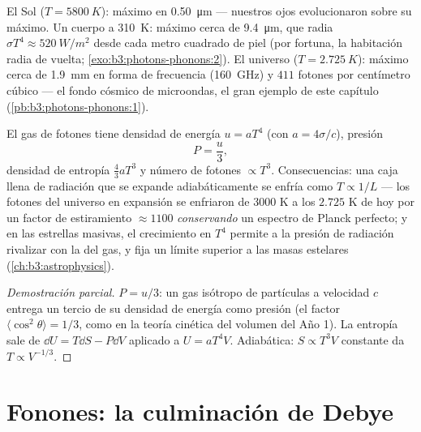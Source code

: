 \begin{example}\label{ex:b3:photons-phonons:thermometers}
El Sol ($T = \qty{5800}{K}$): máximo en \qty{0.50}{\micro m} ---
nuestros ojos evolucionaron sobre su máximo. Un cuerpo a \qty{310}{K}: máximo
cerca de \qty{9.4}{\micro m}, que radia $\sigma T^4 \approx
\qty{520}{W/m^2}$ desde cada metro cuadrado de piel (por fortuna, la
habitación radia de vuelta;
\cref{exo:b3:photons-phonons:2}). El universo ($T =
\qty{2.725}{K}$): máximo cerca de \qty{1.9}{mm} en forma de frecuencia
(\qty{160}{GHz}) y $411$ fotones por centímetro cúbico ---
el fondo cósmico de microondas, el gran ejemplo de este capítulo
(\cref{pb:b3:photons-phonons:1}).
\end{example}

\begin{proposition}\label{prop:b3:photons-phonons:thermo}
El gas de fotones tiene densidad de energía $u = aT^4$ (con $a =
4\sigma/c$), presión
\[
P = \frac u3 ,
\]
densidad de entropía $\tfrac43 aT^3$ y número de fotones $\propto T^3$.
Consecuencias: una caja llena de radiación que se expande adiabáticamente
se enfría como $T \propto 1/L$ --- los fotones del universo en expansión
se enfriaron de $3000$ K a los $2.725$ K de hoy por un factor de estiramiento
$\approx1100$ \emph{conservando} un espectro de Planck perfecto; y
en las estrellas masivas, el crecimiento en $T^4$ permite a la presión de
radiación rivalizar con la del gas, y fija un límite superior a las masas
estelares (\cref{ch:b3:astrophysics}).
\end{proposition}

\begin{proof}[Demostración parcial]
$P = u/3$: un gas isótropo de partículas a velocidad $c$ entrega
un tercio de su densidad de energía como presión (el factor $\langle
\cos^2\theta\rangle = 1/3$, como en la teoría cinética del volumen del
Año 1). La entropía sale de $\dd U = T\dd S - P\dd V$ aplicado a $U =
aT^4V$. Adiabática: $S \propto T^3V$ constante da $T \propto
V^{-1/3}$.
\end{proof}

\section{Fonones: la culminación de Debye}

